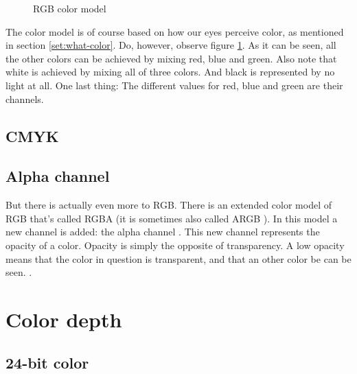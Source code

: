 \begin{figure}[h]
  \centering
  
  \caption{RGB color model}
  \label{fig:rgb}
\end{figure}

The color model is of course based on how our eyes perceive color, as
mentioned in section \ref{set:what-color}. Do, however, observe figure
\ref{fig:rgb}. As it can be seen, all the other colors can be achieved
by mixing red, blue and green. Also note that white is achieved by
mixing all of three colors. And black is represented by no light at
all. One last thing: The different values for red, blue and green are
their channels.

\subsection{CMYK}
\label{sec:cmyk}

\subsection{Alpha channel}
\label{sec:alpha_chan}

But there is actually even more to RGB. There is an extended color
model of RGB that's called RGBA (it is sometimes also
called ARGB ). In this model a new channel is added: the
alpha channel . This new channel represents the
opacity of a color. Opacity is simply the opposite of transparency.  A
low opacity means that the color in question is transparent,
 and that an other color be can be seen.
\cite{porter84_compos_dig_img}.

\section{Color depth}
\label{sec:bit-depth}

\subsection{24-bit color}
\label{sec:24-bit-color}

